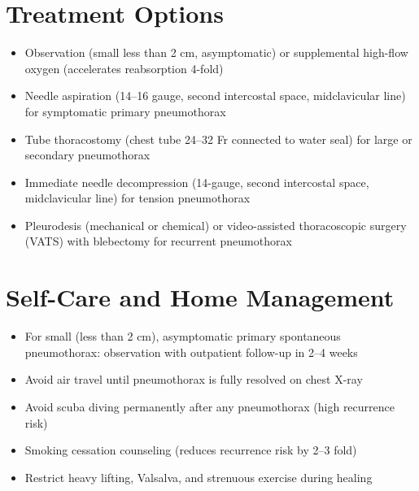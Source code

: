\section*{Treatment Options}
\begin{itemize}
  \item Observation (small less than 2 cm, asymptomatic) or supplemental high-flow oxygen (accelerates reabsorption 4-fold)
  \item Needle aspiration (14--16 gauge, second intercostal space, midclavicular line) for symptomatic primary pneumothorax
  \item Tube thoracostomy (chest tube 24--32 Fr connected to water seal) for large or secondary pneumothorax
  \item Immediate needle decompression (14-gauge, second intercostal space, midclavicular line) for tension pneumothorax
  \item Pleurodesis (mechanical or chemical) or video-assisted thoracoscopic surgery (VATS) with blebectomy for recurrent pneumothorax
\end{itemize}

\section*{Self-Care and Home Management}
\begin{itemize}
  \item For small (less than 2 cm), asymptomatic primary spontaneous pneumothorax: observation with outpatient follow-up in 2--4 weeks
  \item Avoid air travel until pneumothorax is fully resolved on chest X-ray
  \item Avoid scuba diving permanently after any pneumothorax (high recurrence risk)
  \item Smoking cessation counseling (reduces recurrence risk by 2--3 fold)
  \item Restrict heavy lifting, Valsalva, and strenuous exercise during healing
\end{itemize}

